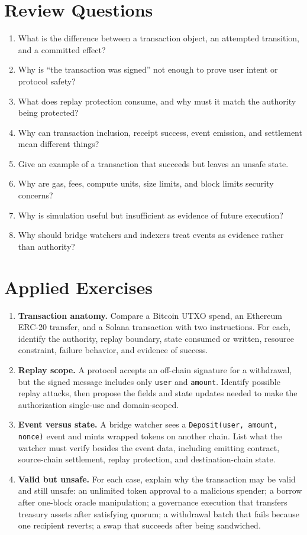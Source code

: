 \section*{Review Questions}

\begin{enumerate}
\item What is the difference between a transaction object, an attempted transition, and a committed effect?
\item Why is ``the transaction was signed'' not enough to prove user intent or protocol safety?
\item What does replay protection consume, and why must it match the authority being protected?
\item Why can transaction inclusion, receipt success, event emission, and settlement mean different things?
\item Give an example of a transaction that succeeds but leaves an unsafe state.
\item Why are gas, fees, compute units, size limits, and block limits security concerns?
\item Why is simulation useful but insufficient as evidence of future execution?
\item Why should bridge watchers and indexers treat events as evidence rather than authority?
\end{enumerate}

\section*{Applied Exercises}

\begin{enumerate}
\item \textbf{Transaction anatomy.} Compare a Bitcoin UTXO spend, an Ethereum ERC-20 transfer, and a Solana transaction with two instructions. For each, identify the authority, replay boundary, state consumed or written, resource constraint, failure behavior, and evidence of success.

\item \textbf{Replay scope.} A protocol accepts an off-chain signature for a withdrawal, but the signed message includes only \texttt{user} and \texttt{amount}. Identify possible replay attacks, then propose the fields and state updates needed to make the authorization single-use and domain-scoped.

\item \textbf{Event versus state.} A bridge watcher sees a \texttt{Deposit(user, amount, nonce)} event and mints wrapped tokens on another chain. List what the watcher must verify besides the event data, including emitting contract, source-chain settlement, replay protection, and destination-chain state.

\item \textbf{Valid but unsafe.} For each case, explain why the transaction may be valid and still unsafe: an unlimited token approval to a malicious spender; a borrow after one-block oracle manipulation; a governance execution that transfers treasury assets after satisfying quorum; a withdrawal batch that fails because one recipient reverts; a swap that succeeds after being sandwiched.
\end{enumerate}
